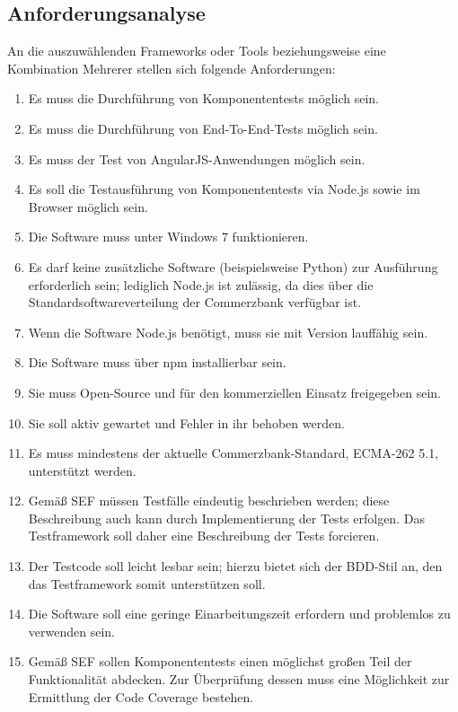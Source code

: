 \subsection{Anforderungsanalyse}
An die auszuwählenden Frameworks oder Tools beziehungsweise eine Kombination Mehrerer stellen sich folgende Anforderungen:
\begin{enumerate}
	\item Es muss die Durchführung von Komponententests möglich sein.
	\item Es muss die Durchführung von End-To-End-Tests möglich sein.
	\item Es muss der Test von AngularJS-Anwendungen möglich sein.
	\item Es soll die Testausführung von Komponententests via Node.js sowie im Browser möglich sein.
	\item Die Software muss unter Windows 7 funktionieren.
	\item Es darf keine zusätzliche Software (beispielsweise Python) zur Ausführung erforderlich sein; lediglich Node.js ist zulässig, da dies über die Standardsoftwareverteilung der Commerzbank verfügbar ist.
	\item Wenn die Software Node.js benötigt, muss sie mit Version  lauffähig sein.
	\item Die Software muss über npm installierbar sein.
	\item Sie muss Open-Source und für den kommerziellen Einsatz freigegeben sein.
	\item Sie soll aktiv gewartet und Fehler in ihr behoben werden.
	\item Es muss mindestens der aktuelle Commerzbank-Standard, ECMA-262 5.1, unterstützt werden\cite[][10]{coba-programmierrichtlinienJavaScript}.
	\item Gemäß SEF müssen Testfälle eindeutig beschrieben werden; diese Beschreibung auch kann durch Implementierung der Tests erfolgen\cite{coba-sef}. Das Testframework soll daher eine Beschreibung der Tests forcieren.
	\item Der Testcode soll leicht lesbar sein\cite[][7]{coba-programmierrichtlinienAllgemein}; hierzu bietet sich der BDD-Stil an, den das Testframework somit unterstützen soll.
	\item Die Software soll eine geringe Einarbeitungszeit erfordern und problemlos zu verwenden sein. 
	\item Gemäß SEF sollen Komponententests \glqq einen möglichst großen Teil der Funktionalität abdecken\grqq{}\cite{coba-sef}. Zur Überprüfung dessen muss eine Möglichkeit zur Ermittlung der Code Coverage bestehen.

\end{enumerate}
